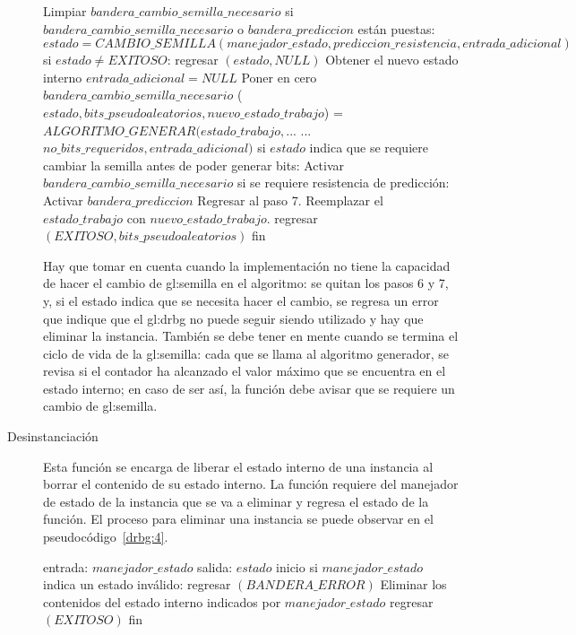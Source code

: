 \begin{description}
\begin{pseudocodigo}[caption={DRBG, generación.}, label={drbg:3}]
      Limpiar $bandera\_cambio\_semilla\_necesario$
      si $bandera\_cambio\_semilla\_necesario$ o $bandera\_prediccion$ están puestas:
        $estado = CAMBIO\_SEMILLA(manejador\_estado, prediccion\_resistencia, entrada\_adicional)$
        si $estado \neq EXITOSO$:
          regresar $(estado, NULL)$
        Obtener el nuevo estado interno
        $entrada\_adicional = NULL$
        Poner en cero $bandera\_cambio\_semilla\_necesario$
      ($estado, bits\_pseudoaleatorios, nuevo\_estado\_trabajo$) = $ALGORITMO\_GENERAR(estado\_trabajo,$...
        ...$no\_bits\_requeridos, entrada\_adicional)$
      si $estado$ indica que se requiere cambiar la semilla antes de poder generar bits:
        Activar $bandera\_cambio\_semilla\_necesario$
        si se requiere resistencia de predicción:
          Activar $bandera\_prediccion$
        Regresar al paso 7.
      Reemplazar el $estado\_trabajo$ con $nuevo\_estado\_trabajo$.
      regresar $(EXITOSO, bits\_pseudoaleatorios)$
    fin
\end{pseudocodigo}
    Hay que tomar en cuenta cuando la implementación no tiene la capacidad de
    hacer el cambio de \gls{gl:semilla} en el algoritmo: se quitan los pasos 6 y
    7, y, si el estado indica que se necesita hacer el cambio, se regresa un
    error que indique que el \gls{gl:drbg} no puede seguir siendo utilizado y
    hay que eliminar la instancia. También se debe tener en mente cuando se
    termina el ciclo de vida de la \gls{gl:semilla}: cada que se llama al
    algoritmo generador, se revisa si el contador ha alcanzado el valor máximo
    que se encuentra en el estado interno; en caso de ser así, la función debe
    avisar que se requiere un cambio de \gls{gl:semilla}.

  \item [Desinstanciación] Esta función se encarga de liberar el estado interno
    de una instancia al borrar el contenido de su estado interno. La función
    requiere del manejador de estado de la instancia que se va a eliminar y
    regresa el estado de la función. El proceso para eliminar una instancia se
    puede observar en el pseudocódigo~\ref{drbg:4}.

\begin{pseudocodigo}[caption={DRBG, desinstanciación.}, label={drbg:4}]
    entrada:  $manejador\_estado$
    salida:   $estado$
    inicio
      si $manejador\_estado$ indica un estado inválido:
        regresar $(BANDERA\_ERROR)$
      Eliminar los contenidos del estado interno indicados por $manejador\_estado$
      regresar $(EXITOSO)$
    fin
\end{pseudocodigo}

\end{description}
